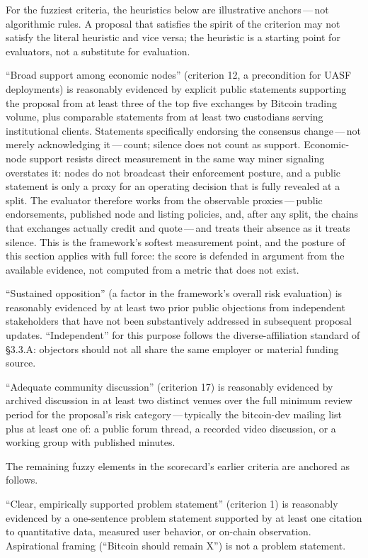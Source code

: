 \documentclass[11pt, twoside, openright]{book}
\newcommand{\sect}[1]{\S#1}
\begin{document}
For the fuzziest criteria, the heuristics below are illustrative anchors\,---\,not algorithmic rules. A proposal that satisfies the spirit of the criterion may not satisfy the literal heuristic and vice versa; the heuristic is a starting point for evaluators, not a substitute for evaluation.

``Broad support among economic nodes'' (criterion 12, a precondition for UASF deployments) is reasonably evidenced by explicit public statements supporting the proposal from at least three of the top five exchanges by Bitcoin trading volume, plus comparable statements from at least two custodians serving institutional clients. Statements specifically endorsing the consensus change\,---\,not merely acknowledging it\,---\,count; silence does not count as support. Economic-node support resists direct measurement in the same way miner signaling overstates it: nodes do not broadcast their enforcement posture, and a public statement is only a proxy for an operating decision that is fully revealed at a split. The evaluator therefore works from the observable proxies\,---\,public endorsements, published node and listing policies, and, after any split, the chains that exchanges actually credit and quote\,---\,and treats their absence as it treats silence. This is the framework's softest measurement point, and the posture of this section applies with full force: the score is defended in argument from the available evidence, not computed from a metric that does not exist.

``Sustained opposition'' (a factor in the framework's overall risk evaluation) is reasonably evidenced by at least two prior public objections from independent stakeholders that have not been substantively addressed in subsequent proposal updates. ``Independent'' for this purpose follows the diverse-affiliation standard of \sect{3.3}.A: objectors should not all share the same employer or material funding source.

``Adequate community discussion'' (criterion 17) is reasonably evidenced by archived discussion in at least two distinct venues over the full minimum review period for the proposal's risk category\,---\,typically the bitcoin-dev mailing list plus at least one of: a public forum thread, a recorded video discussion, or a working group with published minutes.

The remaining fuzzy elements in the scorecard's earlier criteria are anchored as follows.

``Clear, empirically supported problem statement'' (criterion 1) is reasonably evidenced by a one-sentence problem statement supported by at least one citation to quantitative data, measured user behavior, or on-chain observation. Aspirational framing (``Bitcoin should remain X'') is not a problem statement.
\end{document}
